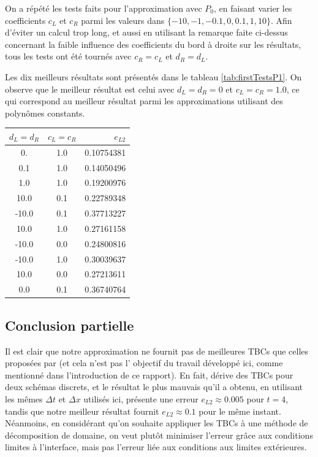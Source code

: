 \indent On a répété les tests faits pour l'approximation avec $P_0$, en faisant varier les coefficients $c_L$ et $c_R$ parmi les valeurs dans $\{-10,-1,-0.1,0,0.1,1,10\}$. Afin d'éviter un calcul trop long, et aussi en utilisant la remarque faite ci-dessus concernant la faible influence des coefficients du bord à droite sur les résultats, tous les tests ont été tournés avec $c_R = c_L$ et $d_R = d_L$.

\indent Les dix meilleurs résultats sont présentés dans le tableau \ref{tab:firstTestsP1}. On observe que le meilleur résultat est celui avec $d_L = d_R = 0$ et $c_L = c_R = 1.0 $, ce qui correspond au meilleur résultat parmi les approximations utilisant des polynômes constants.


\begin{center}
\begin{tabular}{c|c|S[round-precision=4,table-number-alignment =  left]}
	  &  &  \\
	. & 1.0 & 0.10754381 \\
	0.1 & 1.0 & 0.14050496 \\
	1.0 & 1.0 & 0.19200976 \\
	10.0 & 0.1 & 0.22789348 \\
	-10.0 & 0.1 & 0.37713227 \\
	10.0 & 1.0 & 0.27161158 \\
	-10.0 &  0.0 & 0.24800816\\
	-10.0 & 1.0 & 0.30039637 \\
	10.0 & 0.0 & 0.27213611 \\
	0.0 & 0.1 & 0.36740764
\end{tabular}
\end{center}

\subsection{Conclusion partielle}

\indent Il est clair que notre approximation ne fournit pas de meilleures TBCs que celles proposées par \cite{besse2015} (et cela n'est pas l' objectif du travail développé ici, comme mentionné dans l'introduction de ce rapport). En fait, \cite{besse2015} dérive des TBCs pour deux schémas discrets, et le résultat le plus mauvais qu'il a obtenu, en utilisant les mêmes $\Delta t$ et $\Delta x$ utilisés ici, présente une erreur $e_{L2} \approx 0.005$ pour $t = 4$, tandis que notre meilleur résultat fournit $e_{L2} \approx 0.1$ pour le même instant. Néanmoins, en considérant qu'on souhaite appliquer les TBCs à une méthode de décomposition de domaine, on veut plutôt minimiser l'erreur grâce aux conditions limites à l'interface, mais pas l'erreur liée aux conditions aux limites extérieures.


